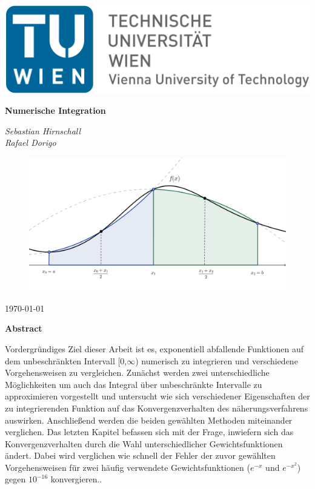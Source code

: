 \documentclass[12pt,a4paper]{scrartcl}
\author{Sebastian Hirnschall, Rafael Dorigo}
\date{\today}
\numberwithin{equation}{section}
\numberwithin{myalgctr}{section}
\numberwithin{mytheoremctr}{subsection}
\numberwithin{mykorollarctr}{subsection}
\numberwithin{mylemmactr}{subsection}
\numberwithin{mybeispielctr}{subsection}
\begin{document}
	\begin{titlepage}
		\begin{flushleft}
				\includegraphics[width=.4\linewidth]{tuwien.png}
		\end{flushleft}	
		\centering
		
		
		\vspace{5cm}
		{\huge\bfseries Numerische Integration\par}
		\vspace{2cm}
		{\Large\itshape Sebastian Hirnschall\\Rafael Dorigo\par}
		\vspace{2cm}
		\begin{figure}[!h]
			\vspace{0cm}
			\centering
			\includegraphics[width=.6\linewidth]{./titlepage.png}
		\end{figure}
		
		\vfill
		
		{\large \today\par}
	\end{titlepage}
	\restoregeometry
	
	\thispagestyle{firststyle}
	
	\newpage\noindent
	{\LARGE \bfseries Abstract}
	\newline
	\par\noindent
	Vordergründiges Ziel dieser Arbeit ist es, exponentiell abfallende Funktionen auf dem unbeschränkten Intervall [0,$\infty$) numerisch zu integrieren und verschiedene Vorgehensweisen zu vergleichen. Zunächst werden zwei unterschiedliche M\"oglichkeiten um auch das Integral \"uber unbeschr\"ankte Intervalle zu approximieren vorgestellt und untersucht wie sich verschiedener Eigenschaften der zu integrierenden Funktion auf das Konvergenzverhalten des n\"aherungsverfahrens auswirken. %
	Anschließend werden die beiden gew\"ahlten Methoden miteinander verglichen.
	Das letzten Kapitel befassen sich mit der Frage, inwiefern sich das Konvergenzverhalten durch die Wahl unterschiedlicher Gewichtsfunktionen \"andert. Dabei wird verglichen wie schnell der Fehler der zuvor gew\"ahlten Vorgehensweisen f\"ur zwei h\"aufig verwendete Gewichtsfunktionen ($e^{-x}$ und $e^{-x^2}$) gegen $10^{-16}$ konvergieren.. 
	\thispagestyle{firststyle}
	
\end{document}
